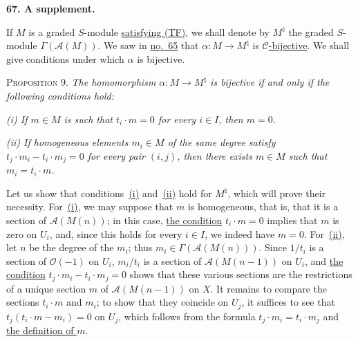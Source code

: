 
\label{fac:III:3:no:67}
\textbf{67. A supplement.}

\label{fac:III:3:no:67:def:M-natural}
If $M$ is a graded $S$-module
\hyperref[fac:III:2:no:56:def:TF]{satisfying (TF)}, we shall denote by
$M^\natural$ the graded $S$-module $\Gamma(\mathcal{A}(M))$. We saw in
\label{fac:III:3:no:67:map:alpha}
\hyperref[fac:III:3:no:65:prop:5]{no.~65} that
$\alpha:M\longrightarrow M^\natural$ is
\hyperref[fac:III:2:no:56:def:C-morphism]{$\mathcal{C}$-bijective}. We shall
give conditions under which $\alpha$ is bijective.

\label{fac:III:3:no:67:prop:9}
\textsc{Proposition 9.} \textit{The homomorphism
$\alpha:M\longrightarrow M^\natural$ is bijective if and only if the
following conditions hold:}

\label{fac:III:3:no:67:prop:9:item:i}
\textit{(i) If $m\in M$ is such that $t_i\cdot m=0$ for every $i\in I$,
then $m=0$.}

\label{fac:III:3:no:67:prop:9:item:ii}
\textit{(ii) If homogeneous elements $m_i\in M$ of the same degree satisfy
$t_j\cdot m_i-t_i\cdot m_j=0$ for every pair $(i,j)$, then there exists
$m\in M$ such that $m_i=t_i\cdot m$.}

\label{fac:III:3:no:67:proof:necessity}
Let us show that conditions~\hyperref[fac:III:3:no:67:prop:9:item:i]{(i)}
and~\hyperref[fac:III:3:no:67:prop:9:item:ii]{(ii)} hold for $M^\natural$,
which will prove their necessity.
For~\hyperref[fac:III:3:no:67:prop:9:item:i]{(i)}, we may suppose that $m$ is
homogeneous, that is, that it is a section of $\mathcal{A}(M(n))$; in this
case, \hyperref[fac:III:3:no:67:prop:9:item:i]{the condition}
$t_i\cdot m=0$ implies that $m$ is zero on $U_i$, and,
since this holds for every $i\in I$, we indeed have $m=0$.
For~\hyperref[fac:III:3:no:67:prop:9:item:ii]{(ii)}, let
$n$ be the degree of the $m_i$; thus
$m_i\in\Gamma(\mathcal{A}(M(n)))$. Since $1/t_i$ is a section of
$\mathcal{O}(-1)$ on $U_i$, $m_i/t_i$ is a section of
$\mathcal{A}(M(n-1))$ on $U_i$, and
\hyperref[fac:III:3:no:67:prop:9:item:ii]{the condition}
$t_j\cdot m_i-t_i\cdot m_j=0$ shows that these various sections are the
\label{fac:III:3:no:67:proof:necessity:section-m}
restrictions of a unique section $m$ of $\mathcal{A}(M(n-1))$ on $X$. It
remains to compare the sections $t_i\cdot m$ and $m_i$; to show that they
coincide on $U_j$, it suffices to see that
$t_j(t_i\cdot m-m_i)=0$ on $U_j$, which follows from the formula
$t_j\cdot m_i=t_i\cdot m_j$ and
\hyperref[fac:III:3:no:67:proof:necessity:section-m]{the definition of $m$}.

